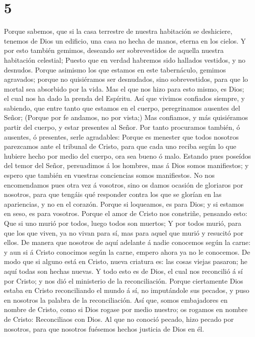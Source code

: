 \hypertarget{section-4}{%
\section{5}\label{section-4}}

 Porque sabemos, que si la casa terrestre de nuestra
habitación se deshiciere, tenemos de Dios un edificio, una casa no hecha
de manos, eterna en los cielos.  Y por esto también gemimos,
deseando ser sobrevestidos de aquella nuestra habitación celestial;
 Puesto que en verdad habremos sido hallados vestidos, y no
desnudos.  Porque asimismo los que estamos en este
tabernáculo, gemimos agravados; porque no quisiéramos ser desnudados,
sino sobrevestidos, para que lo mortal sea absorbido por la vida.
 Mas el que nos hizo para esto mismo, es Dios; el cual nos
ha dado la prenda del Espíritu.  Así que vivimos confiados
siempre, y sabiendo, que entre tanto que estamos en el cuerpo,
peregrinamos ausentes del Señor;  (Porque por fe andamos, no
por vista;)  Mas confiamos, y más quisiéramos partir del
cuerpo, y estar presentes al Señor.  Por tanto procuramos
también, ó ausentes, ó presentes, serle agradables:  Porque
es menester que todos nosotros parezcamos ante el tribunal de Cristo,
para que cada uno reciba según lo que hubiere hecho por medio del
cuerpo, ora sea bueno ó malo.  Estando pues poseídos del
temor del Señor, persuadimos á los hombres, mas á Dios somos
manifiestos; y espero que también en vuestras conciencias somos
manifiestos.  No nos encomendamos pues otra vez á vosotros,
sino os damos ocasión de gloriaros por nosotros, para que tengáis qué
responder contra los que se glorían en las apariencias, y no en el
corazón.  Porque si loqueamos, es para Dios; y si estamos
en seso, es para vosotros.  Porque el amor de Cristo nos
constriñe, pensando esto: Que si uno murió por todos, luego todos son
muertos;  Y por todos murió, para que los que viven, ya no
vivan para sí, mas para aquel que murió y resucitó por ellos.
 De manera que nosotros de aquí adelante á nadie conocemos
según la carne: y aun si á Cristo conocimos según la carne, empero ahora
ya no le conocemos.  De modo que si alguno está en Cristo,
nueva criatura es: las cosas viejas pasaron; he aquí todas son hechas
nuevas.  Y todo esto es de Dios, el cual nos reconcilió á
sí por Cristo; y nos dió el ministerio de la reconciliación.
 Porque ciertamente Dios estaba en Cristo reconciliando el
mundo á sí, no imputándole sus pecados, y puso en nosotros la palabra de
la reconciliación.  Así que, somos embajadores en nombre de
Cristo, como si Dios rogase por medio nuestro; os rogamos en nombre de
Cristo: Reconciliaos con Dios.  Al que no conoció pecado,
hizo pecado por nosotros, para que nosotros fuésemos hechos justicia de
Dios en él.

